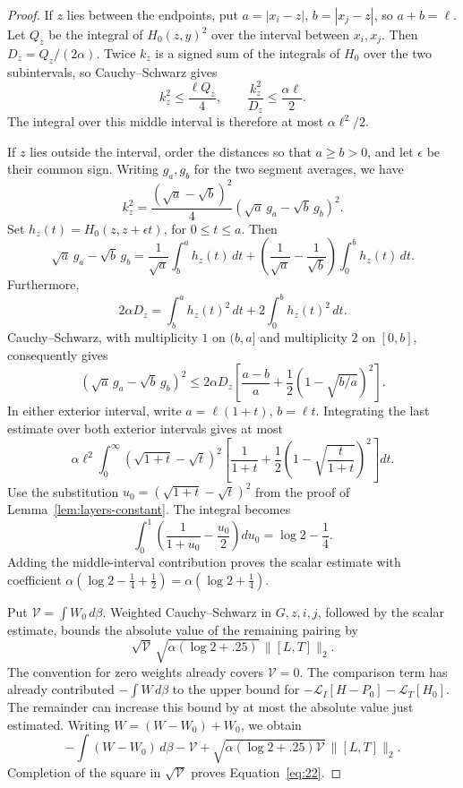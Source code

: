 \begin{proof}
If \(z\) lies between the endpoints, put
\(a=|x_i-z|\), \(b=|x_j-z|\), so \(a+b=\ell\).
Let \(Q_z\) be the integral of \(H_0(z,y)^2\) over the interval
between \(x_i,x_j\).
Then \(D_z=Q_z/(2\alpha)\).
Twice \(k_z\) is a signed sum of the integrals of \(H_0\)
over the two subintervals, so Cauchy--Schwarz gives
\[
 k_z^2\le\frac{\ell Q_z}{4},\qquad
 \frac{k_z^2}{D_z}\le\frac{\alpha\ell}{2}.
\]
The integral over this middle interval is therefore at most
\(\alpha\ell^2/2\).

If \(z\) lies outside the interval, order the distances so that
\(a\ge b>0\), and let \(\epsilon\) be their common sign.
Writing \(g_a,g_b\) for the two segment averages, we have
\[
 k_z^2
 =\frac{(\sqrt a-\sqrt b)^2}{4}
          (\sqrt a\,g_a-\sqrt b\,g_b)^2.
\]
Set \(h_z(t)=H_0(z,z+\epsilon t)\), for \(0\le t\le a\).
Then
\[
 \sqrt a\,g_a-\sqrt b\,g_b
 =\frac1{\sqrt a}\int_b^a h_z(t)\,dt
   +\left(\frac1{\sqrt a}-\frac1{\sqrt b}\right)
                         \int_0^b h_z(t)\,dt.
\]
Furthermore,
\[
 2\alpha D_z
 =\int_b^a h_z(t)^2\,dt+2\int_0^b h_z(t)^2\,dt.
\]
Cauchy--Schwarz, with multiplicity \(1\) on \((b,a]\)
and multiplicity \(2\) on \([0,b]\), consequently gives
\[
 (\sqrt a\,g_a-\sqrt b\,g_b)^2
 \le 2\alpha D_z
       \left[\frac{a-b}{a}
                    +\frac12(1-\sqrt{b/a})^2\right].
\]
In either exterior interval, write \(a=\ell(1+t)\),
\(b=\ell t\).  Integrating the last estimate over both
exterior intervals gives at most
\[
 \alpha\ell^2\int_0^\infty
  (\sqrt{1+t}-\sqrt t)^2
  \left[\frac1{1+t}
             +\frac12\left(1-\sqrt{\frac{t}{1+t}}\right)^2\right]dt.
\]
Use the substitution \(u_0=(\sqrt{1+t}-\sqrt t)^2\)
from the proof of Lemma~\ref{lem:layers-constant}.
The integral becomes
\[
 \int_0^1\left(\frac1{1+u_0}-\frac{u_0}{2}\right)du_0
 =\log2-\frac14.
\]
Adding the middle-interval contribution proves the scalar
estimate with coefficient
\(\alpha(\log2-\tfrac14+\tfrac12)
=\alpha(\log2+\tfrac14)\).

Put \(\mathcal V=\int W_0\,d\beta\).
Weighted Cauchy--Schwarz in \(G,z,i,j\), followed by the scalar
estimate, bounds the absolute value of the remaining pairing by
\[
 \sqrt{\mathcal V}\,
 \sqrt{\alpha(\log2+.25)}\,\|[L,T]\|_2.
\]
The convention for zero weights already covers \(\mathcal V=0\).
The comparison term has already contributed \(-\int W\,d\beta\)
to the upper bound for
\(-\mathcal L_I[H-P_0]-\mathcal L_T[H_0]\).
The remainder can increase this bound by at most the absolute value
just estimated. Writing \(W=(W-W_0)+W_0\), we obtain
\[
 -\int(W-W_0)\,d\beta
 -\mathcal V+\sqrt{\alpha(\log2+.25)\mathcal V}\,\|[L,T]\|_2.
\]
Completion of the square in \(\sqrt{\mathcal V}\) proves
Equation~\eqref{eq:22}.
\end{proof}

